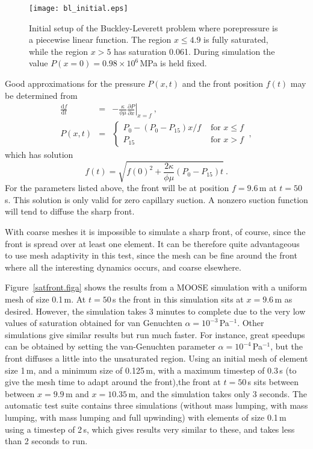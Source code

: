 \documentclass[]{scrreprt}
\begin{document}
\begin{figure}[htb]
\begin{center}
\texttt{[image: bl\_initial.eps]}
\caption{Initial setup of the Buckley-Leverett problem where
  porepressure is a piecewise linear function.  The region
$x\leq 4.9$ is fully saturated, while the region $x>5$ has saturation
  0.061.  During simulation the value $P(x=0)=0.98\times 10^{6}$\,MPa
  is held fixed.}
\label{bl_setup.figa}
\end{center}
\end{figure}

Good approximations for the pressure $P(x,t)$
and the front position $f(t)$ may be determined from
\begin{eqnarray}
\frac{{\mathrm d} f}{{\mathrm d} t} & = & -\frac{\kappa}{\phi\mu}
\left.\frac{\partial  P}{\partial x}\right|_{x = f} \ , \nonumber \\
P(x,t) & = & \left\{
\begin{array}{ll}
P_{0} - (P_{0}-P_{15})x/f & \mbox{ for } x\leq f  \\
P_{15} & \mbox{ for } x>f
\end{array}
\right. \ ,
\label{eqn.predicted.bl.posn.eqna}
\end{eqnarray}
which has solution
\begin{equation}
f(t) = \sqrt{f(0)^{2} + \frac{2\kappa}{\phi\mu}(P_{0}-P_{15})t} \ .
\end{equation}
For the parameters listed above, the front will be at position
$f=9.6$\,m at $t=50$\,s.  This solution is only valid for zero
capillary suction.  A nonzero suction function will tend to diffuse
the sharp front.

With coarse meshes it is impossible to simulate a sharp front, of
course, since the front is spread over at least one element.  It can be
therefore quite advantageous to use mesh adaptivity in this test,
since the mesh can be fine around the front where all the interesting
dynamics occurs, and coarse elsewhere.

Figure~\ref{satfront.figa} shows the results from a MOOSE simulation
with a uniform mesh of size 0.1\,m.  At $t=50$\,s the front in this
simulation sits at $x=9.6$\,m as desired.  However, the simulation
takes 3 minutes to complete due to the very low values of saturation
obtained for van Genuchten $\alpha=10^{-3}$\,Pa$^{-1}$.  Other
simulations give similar results but run much faster.  For instance,
great speedups can be obtained by setting the van-Genuchten parameter
$\alpha=10^{-4}$\,Pa$^{-1}$, but the front diffuses a little into the
unsaturated region.  Using an initial mesh of element size 1\,m, and a
minimum size of 0.125\,m, with a maximum timestep of 0.3\,s (to give
the mesh time to adapt around the front),the front at $t=50$\,s sits
between between $x=9.9$\,m and $x=10.35$\,m, and the simulation takes
only 3 seconds.  The automatic test suite contains three simulations
(without mass lumping, with mass lumping, with mass lumping and full
upwinding) with elements of size 0.1\,m using a timestep of 2\,s,
which gives results very similar to these, and takes less than 2
seconds to run.
\end{document}
